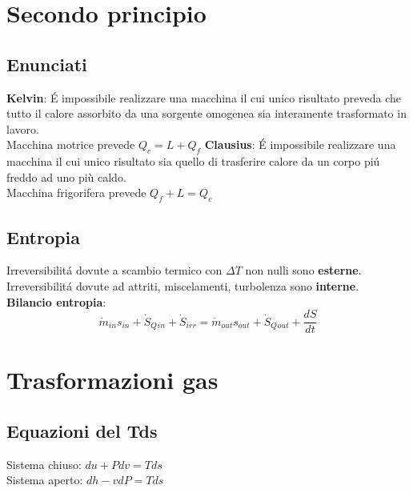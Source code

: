\documentclass[portrait,a4paper]{article}
\begin{document}
\begin{multicols}{3}
\section*{Secondo principio}
\subsection*{Enunciati}
\textbf{Kelvin}: É impossibile realizzare una macchina il cui unico risultato preveda che tutto il calore assorbito da una sorgente omogenea sia interamente trasformato in lavoro. \\
Macchina motrice prevede \(Q_c = L + Q_f\)
\textbf{Clausius}: É impossibile realizzare una macchina il cui unico risultato sia quello di trasferire calore da un corpo piú freddo ad uno più caldo. \\
Macchina frigorifera prevede \(Q_f + L = Q_c\)
\subsection*{Entropia}
Irreversibilitá dovute a scambio termico con \(\Delta T\) non nulli sono \textbf{esterne}. \\
Irreversibilitá dovute ad attriti, miscelamenti, turbolenza sono \textbf{interne}. \\
\textbf{Bilancio entropia}: \\
\[\dot{m}_{in}s_{in} + \dot{S}_Q{_{in}} + \dot{S}_{irr} = \dot{m}_{out}s_{out} + \dot{S}_Q{_{out}} + \frac{dS}{dt}\]

\section*{Trasformazioni gas}
\subsection*{Equazioni del Tds}
Sistema chiuso: \(du + Pdv = Tds\) \\
Sistema aperto: \(dh -vdP = Tds\)

\end{multicols}
\end{document}
